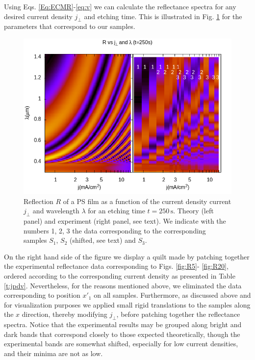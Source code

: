 \documentclass[review,sort&compress]{cas-sc}
\begin{document}
Using Eqs.  \eqref{Eq:ECMR}-\eqref{eq:v} we can calculate the
reflectance spectra for any
desired current density $j_\perp$ and etching time. This is
illustrated in Fig. \ref{fig:Rvsjl} for the parameters that correspond
to our samples.
\begin{figure}
  \centering
  \includegraphics[width=\textwidth]{fig13}
  \caption{Reflection $R$ of a PS film as a function of the current density
    current $j_\perp$ and wavelength $\lambda$ for an etching time
    $t=250\,\text{s}$. Theory (left panel) and experiment (right
    panel, see text). We indicate with the numbers 1, 2, 3 the
    data corresponding to the corresponding samples $S_1$, $S_2$
    (shifted, see text) and  $S_3$.}
  \label{fig:Rvsjl}
\end{figure}
On the right hand side of the figure we display a quilt made by
patching together the experimental reflectance data corresponding to
Figs. \ref{fig:R5}- \ref{fig:R20}, ordered according to the
corresponding current density as presented in Table
\ref{t:jpdv}. Nevertheless, for the reasons mentioned above, we
eliminated the data corresponding to position $x'_1$ on all
samples. Furthermore, as discussed above and for visualization
purposes we applied small rigid translations to the samples along the
$x$ direction, thereby modifying $j_\perp$, before patching together
the reflectance spectra.
Notice that the experimental results may
be grouped along bright and dark bands that correspond closely to
those expected theoretically, though the experimental bands are somewhat shifted,
especially for low current densities, and their minima are not as low.
\end{document}
